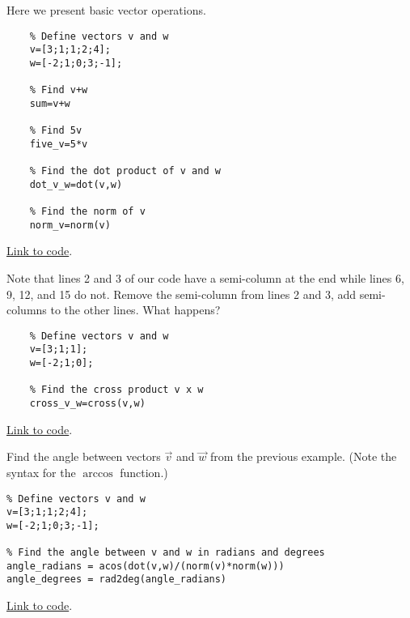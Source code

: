 \documentclass{ximera}
\begin{document}
\begin{template}\label{temp:vectorOps}
Here we present basic vector operations.
\begin{verbatim}
    % Define vectors v and w
    v=[3;1;1;2;4];
    w=[-2;1;0;3;-1]; 

    % Find v+w  
    sum=v+w

    % Find 5v
    five_v=5*v

    % Find the dot product of v and w
    dot_v_w=dot(v,w)

    % Find the norm of v
    norm_v=norm(v)
\end{verbatim}

\href{https://sagecell.sagemath.org/?z=eJxdTUsKwyAQ3QveYTaBpG2gSZqVuCu9RChSolIX0WDMeP2O3TSUWbw37zNTwd1Y5w2gmVOIGyC8vIbMGcppEB1NL25PwVmWU9vTehWDaLuicFbBw1EazxmAs21fJNGDMSJn1qFRKMcTHoz0NqBDgjUGvc8Jgv09Jl2hypKwxktu_mo-xOWb56xQOl2gxuYDFmw51w==&lang=octave&interacts=eJyLjgUAARUAuQ==}{Link to code}.

\begin{remark}
    Note that lines 2 and 3 of our code have a semi-column at the end while lines 6, 9, 12, and 15 do not.  Remove the semi-column from lines 2 and 3, add semi-columns to the other lines.  What happens?
\end{remark}

\begin{verbatim}
    % Define vectors v and w
    v=[3;1;1];
    w=[-2;1;0];
    
    % Find the cross product v x w
    cross_v_w=cross(v,w)
    \end{verbatim}
    
    \href{https://sagecell.sagemath.org/?z=eJxTVXBJTcvMS1UoS00uyS8qVihTSMxLUSjn5SqzjTa2NrQ2jLXm5Sq3jdY1AnIMQBxeLlUFt0ygopKMVIXkovziYoWCovyU0uQSoOYKkFawYHxZfLktmKVRplOuCQBmGSA1&lang=octave&interacts=eJyLjgUAARUAuQ==}{Link to code}.

\end{template}

\begin{example}\label{ex:angleInOctave}
    Find the angle between vectors $\vec{v}$ and $\vec{w}$ from the previous example.  (Note the syntax for the $\arccos{}$ function.)
    \begin{explanation}
        \begin{verbatim}
% Define vectors v and w
v=[3;1;1;2;4];
w=[-2;1;0;3;-1];

% Find the angle between v and w in radians and degrees
angle_radians = acos(dot(v,w)/(norm(v)*norm(w)))
angle_degrees = rad2deg(angle_radians)
        \end{verbatim}

\href{https://sagecell.sagemath.org/?z=eJxVjM8KAiEQxu-C7zCXBY2WWreb7C16iSXC1mkTSkFFX79pyUPMYfj-_L4OzvhwHqHgkkNMUMB4C5WzMs2jHuiUPl01Z3Wae0XyqEfdD1-Hsw4ujtr5iUStL4Q75oro2wo4D9FYZ3zaDItrREycbe1biyYwS0jChizKvsqD8CG-RZG77VcpZSN-A0QQq0iJvyX5AVWtQWc=&lang=octave&interacts=eJyLjgUAARUAuQ==}{Link to code}.        
    \end{explanation}
\end{example}
\end{document}
